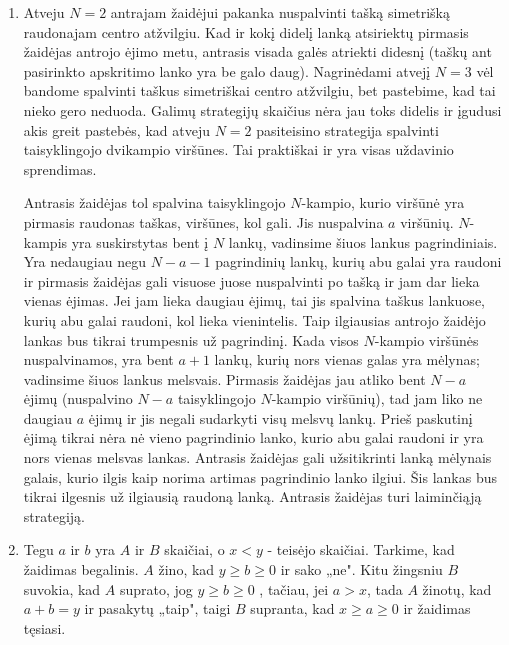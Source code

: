 \begin{enumerate}
(Sprendimas Nr. 2) Susižymėkime lentelės langelius kaip kordinates $(x,y)$, kur $x$, $y$ yra
teigiami sveikieji. Tarkime, kad žirgo pastatymas $(1,1)$ langelyje ir
paėjimas į langelį $(3,2)$ įstumia $A$ į pralaiminčią poziciją (kitu atveju
įrodymas jau yra baigtas). Tada $B$ savo ėjimu peina į langelį $(X,Y)$ taip,
kad $A$ vėl atsidurtų pralaiminčioje pozicijoje. Pastebime, kad jei $A$ pirmu
ėjimu pastato žirgą į $(2,3)$, tada ėjimas į $(Y,X)$ garantuoja $A$ pergalę.
Dabartinė situacija nuo pirmosios skiriasi tik tuo, kad žirgas nepabuvojo
langelyje $(1,1)$. Tačiau šis langelis yra nepasiekiamas $B$, tad tai nedaro įtakos baigčiai.
\item 
Atveju $N=2$ antrajam žaidėjui pakanka nuspalvinti tašką simetrišką
raudonajam centro atžvilgiu. Kad ir kokį didelį lanką atsiriektų pirmasis
žaidėjas antrojo ėjimo metu, antrasis visada galės atriekti didesnį (taškų
ant pasirinkto apskritimo lanko yra be galo daug). Nagrinėdami atvejį
$N=3$ vėl bandome spalvinti taškus simetriškai centro atžvilgiu, bet
pastebime, kad tai nieko gero neduoda. Galimų strategijų skaičius nėra jau
toks didelis ir įgudusi akis greit pastebės, kad atveju $N=2$ pasiteisino
strategija spalvinti taisyklingojo dvikampio viršūnes. Tai praktiškai ir
yra visas uždavinio sprendimas. 

Antrasis žaidėjas tol spalvina taisyklingojo $N$-kampio, kurio viršūnė yra
pirmasis raudonas taškas, viršūnes, kol gali. Jis nuspalvina $a$ viršūnių.
$N$-kampis yra suskirstytas bent į $N$ lankų, vadinsime šiuos lankus
pagrindiniais. Yra nedaugiau negu $N-a-1$ pagrindinių lankų, kurių abu
galai yra raudoni ir pirmasis žaidėjas gali visuose juose nuspalvinti po
tašką ir jam dar lieka vienas ėjimas. Jei jam lieka daugiau ėjimų, tai jis
spalvina taškus lankuose, kurių abu galai raudoni, kol lieka vienintelis.
Taip ilgiausias antrojo žaidėjo lankas bus tikrai trumpesnis už
pagrindinį. Kada visos $N$-kampio viršūnės nuspalvinamos, yra bent $a+1$
lankų, kurių nors vienas galas yra mėlynas; vadinsime šiuos lankus
melsvais. Pirmasis žaidėjas jau atliko bent $N-a$ ėjimų (nuspalvino $N-a$
taisyklingojo $N$-kampio viršūnių), tad jam liko ne daugiau $a$ ėjimų ir jis
negali sudarkyti visų melsvų lankų. Prieš paskutinį ėjimą tikrai nėra nė
vieno pagrindinio lanko, kurio abu galai raudoni ir yra nors vienas
melsvas lankas. Antrasis žaidėjas gali užsitikrinti lanką mėlynais galais,
kurio ilgis kaip norima artimas pagrindinio lanko ilgiui. Šis lankas bus
tikrai ilgesnis už ilgiausią raudoną lanką. Antrasis žaidėjas turi
laiminčiąją strategiją.
\item 
Tegu $a$ ir $b$ yra $A$ ir $B$ skaičiai, o $x<y$ - teisėjo skaičiai.
Tarkime, kad žaidimas begalinis. $A$ žino, kad   $y\geq b\geq0$  ir sako
„ne". Kitu žingsniu $B$ suvokia, kad $A$ suprato, jog $y\geq b\geq0$ ,
tačiau, jei $a>x$, tada $A$ žinotų, kad $a+b=y$ ir pasakytų „taip", taigi
$B$ supranta, kad $x\geq a\geq0$ ir žaidimas tęsiasi. 


\end{enumerate}
